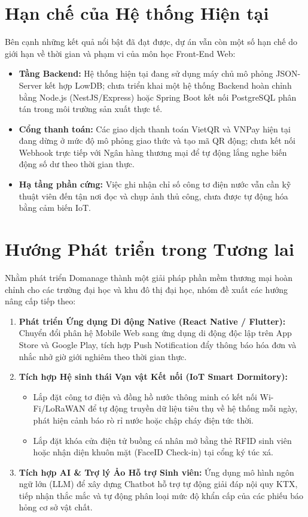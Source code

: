\section{Hạn chế của Hệ thống Hiện tại}
Bên cạnh những kết quả nổi bật đã đạt được, dự án vẫn còn một số hạn chế do giới hạn về thời gian và phạm vi của môn học Front-End Web:
\begin{itemize}
    \item \textbf{Tầng Backend:} Hệ thống hiện tại đang sử dụng máy chủ mô phỏng JSON-Server kết hợp LowDB; chưa triển khai một hệ thống Backend hoàn chỉnh bằng Node.js (NestJS/Express) hoặc Spring Boot kết nối PostgreSQL phân tán trong môi trường sản xuất thực tế.
    \item \textbf{Cổng thanh toán:} Các giao dịch thanh toán VietQR và VNPay hiện tại đang dừng ở mức độ mô phỏng giao thức và tạo mã QR động; chưa kết nối Webhook trực tiếp với Ngân hàng thương mại để tự động lắng nghe biến động số dư theo thời gian thực.
    \item \textbf{Hạ tầng phần cứng:} Việc ghi nhận chỉ số công tơ điện nước vẫn cần kỹ thuật viên đến tận nơi đọc và chụp ảnh thủ công, chưa được tự động hóa bằng cảm biến IoT.
\end{itemize}

\section{Hướng Phát triển trong Tương lai}
Nhằm phát triển Domanage thành một giải pháp phần mềm thương mại hoàn chỉnh cho các trường đại học và khu đô thị đại học, nhóm đề xuất các hướng nâng cấp tiếp theo:
\begin{enumerate}
    \item \textbf{Phát triển Ứng dụng Di động Native (React Native / Flutter):} Chuyển đổi phân hệ Mobile Web sang ứng dụng di động độc lập trên App Store và Google Play, tích hợp Push Notification đẩy thông báo hóa đơn và nhắc nhở giờ giới nghiêm theo thời gian thực.
    \item \textbf{Tích hợp Hệ sinh thái Vạn vật Kết nối (IoT Smart Dormitory):}
    \begin{itemize}
        \item Lắp đặt công tơ điện và đồng hồ nước thông minh có kết nối Wi-Fi/LoRaWAN để tự động truyền dữ liệu tiêu thụ về hệ thống mỗi ngày, phát hiện cảnh báo rò rỉ nước hoặc chập cháy điện tức thời.
        \item Lắp đặt khóa cửa điện tử buồng cá nhân mở bằng thẻ RFID sinh viên hoặc nhận diện khuôn mặt (FaceID Check-in) tại cổng ký túc xá.
    \end{itemize}
    \item \textbf{Tích hợp AI \& Trợ lý Ảo Hỗ trợ Sinh viên:} Ứng dụng mô hình ngôn ngữ lớn (LLM) để xây dựng Chatbot hỗ trợ tự động giải đáp nội quy KTX, tiếp nhận thắc mắc và tự động phân loại mức độ khẩn cấp của các phiếu báo hỏng cơ sở vật chất.
\end{enumerate}

